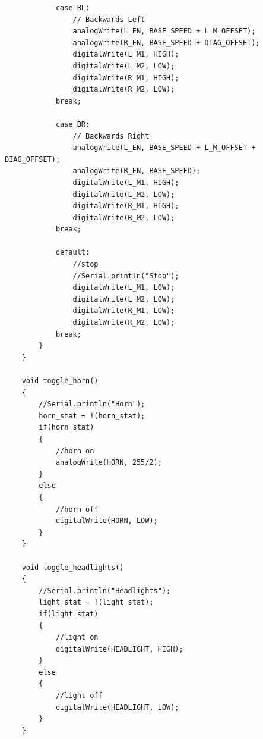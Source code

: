 \documentclass{article}
\begin{document}
\begin{lstlisting}
			case BL:
				// Backwards Left
				analogWrite(L_EN, BASE_SPEED + L_M_OFFSET);
				analogWrite(R_EN, BASE_SPEED + DIAG_OFFSET);
				digitalWrite(L_M1, HIGH);
				digitalWrite(L_M2, LOW);
				digitalWrite(R_M1, HIGH);
				digitalWrite(R_M2, LOW);
			break;
			
			case BR:
				// Backwards Right
				analogWrite(L_EN, BASE_SPEED + L_M_OFFSET + DIAG_OFFSET);
				analogWrite(R_EN, BASE_SPEED);
				digitalWrite(L_M1, HIGH);
				digitalWrite(L_M2, LOW);
				digitalWrite(R_M1, HIGH);
				digitalWrite(R_M2, LOW);
			break;
			
			default:
				//stop
				//Serial.println("Stop");
				digitalWrite(L_M1, LOW);
				digitalWrite(L_M2, LOW);
				digitalWrite(R_M1, LOW);
				digitalWrite(R_M2, LOW);
			break;
		}
	}
	
	void toggle_horn()
	{
		//Serial.println("Horn");
		horn_stat = !(horn_stat);
		if(horn_stat)
		{
			//horn on
			analogWrite(HORN, 255/2);
		}
		else
		{
			//horn off
			digitalWrite(HORN, LOW);
		}
	}
	
	void toggle_headlights()
	{
		//Serial.println("Headlights");
		light_stat = !(light_stat);
		if(light_stat)
		{
			//light on
			digitalWrite(HEADLIGHT, HIGH);
		}
		else
		{
			//light off
			digitalWrite(HEADLIGHT, LOW);
		}
	}
	\end{lstlisting}
\end{document}
